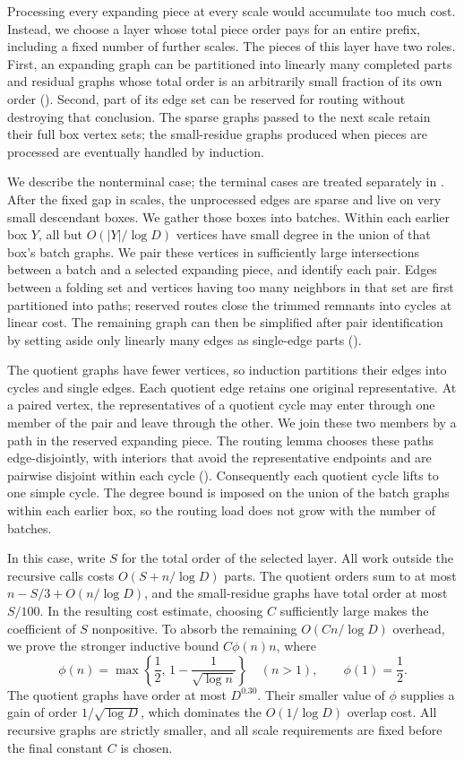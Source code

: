\documentclass[11pt]{article}
\numberwithin{equation}{section}
\theoremstyle{definition}
\theoremstyle{remark}
\newcommand{\abs}[1]{\left|#1\right|}
\begin{document}
Processing every expanding piece at every scale would accumulate too
much cost. Instead, we choose a layer whose total piece order pays
for an entire prefix, including a fixed number of further scales.
The pieces of this layer have two roles. First, an expanding graph
can be partitioned into linearly many completed parts and residual
graphs whose total order is an arbitrarily small fraction of its
own order (). Second, part of its edge set
can be reserved for routing without destroying that conclusion.
The sparse graphs passed to the next scale retain their full box
vertex sets; the small-residue graphs produced when pieces are
processed are eventually handled by induction.

We describe the nonterminal case; the terminal cases are treated
separately in . After the fixed gap in scales,
the unprocessed edges are sparse and
live on very small descendant boxes. We gather those boxes into
batches. Within each earlier box \(Y\), all but
\(O(\abs{Y}/\log D)\) vertices have small degree in the union of
that box's batch graphs. We pair these vertices in sufficiently large
intersections between a batch and a selected expanding piece, and
identify each pair. Edges between a folding set and vertices having
too many neighbors in that set are first partitioned into paths; reserved
routes close the trimmed remnants into cycles at linear cost. The
remaining graph can then be simplified after pair identification by
setting aside only linearly many edges as single-edge parts
().

The quotient graphs have fewer vertices, so induction partitions
their edges into cycles and single edges. Each quotient edge retains
one original representative. At a paired vertex, the representatives
of a quotient cycle may enter through one member of the pair and leave
through the other. We join these two members by a path in the reserved
expanding piece. The routing lemma chooses these paths edge-disjointly,
with interiors that avoid the representative endpoints and are pairwise
disjoint within each cycle (). Consequently each
quotient cycle lifts to one simple cycle. The degree bound is imposed
on the union of the batch graphs within each
earlier box, so the routing load does not grow with the number of batches.

In this case, write \(S\) for the total order of the selected layer.
All work outside the recursive calls costs \(O(S+n/\log D)\) parts.
The quotient orders sum to at most \(n-S/3+O(n/\log D)\), and the
small-residue graphs have total order at most \(S/100\). In the
resulting cost estimate, choosing \(C\) sufficiently large makes
the coefficient of \(S\) nonpositive. To absorb the remaining
\(O(Cn/\log D)\) overhead, we prove the stronger inductive bound
\(C\phi(n)n\), where
\[
 \phi(n)=\max\left\{\frac12,\,
                 1-\frac1{\sqrt{\log n}}\right\}
 \quad(n>1),\qquad \phi(1)=\frac12.
\]
The quotient graphs have order at most \(D^{0.30}\). Their smaller
value of \(\phi\) supplies a gain of order \(1/\sqrt{\log D}\),
which dominates the \(O(1/\log D)\) overlap cost.
All recursive graphs are strictly smaller, and all scale
requirements are fixed before the final constant \(C\) is chosen.
\end{document}
